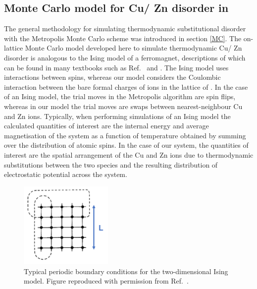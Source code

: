 \documentclass[11pt, twoside]{report}
\begin{document}
\subsection{Monte Carlo model for Cu/ Zn disorder in {\CZTS}}\label{Eris}
The general methodology for simulating thermodynamic substitutional disorder with the Metropolis Monte Carlo scheme was introduced in section \ref{MC}. The on-lattice Monte Carlo model developed here to simulate thermodynamic Cu/ Zn disorder is analogous to the Ising model of a ferromagnet, descriptions of which can be found in many textbooks such as Ref.~ and . 
The Ising model uses interactions between spins, whereas our model considers the Coulombic interaction between the bare formal charges of ions in the lattice of {\CZTS}.
In the case of an Ising model, the trial moves in the Metropolis algorithm are spin flips, whereas in our model the trial moves are swaps between nearest-neighbour Cu and Zn ions. Typically, when performing simulations of an Ising model the calculated quantities of interest are the internal energy and average magnetisation of the system as a function of temperature obtained by summing over the distribution of atomic spins. In the case of our system, the quantities of interest are the spatial arrangement of the Cu and Zn ions due to thermodynamic substitutions between the two species and the resulting distribution of electrostatic potential across the system.

\begin{figure}[h!]
  \centering
    \includegraphics[width=0.4\textwidth]{figures/MC_PBCs.png}
    \caption[Typical periodic boundary conditions for the two-dimensional Ising model.]{Typical periodic boundary conditions for the two-dimensional Ising model. Figure reproduced with permission from Ref.~.}
  \label{MC_PBCs}
\end{figure}
\end{document}
